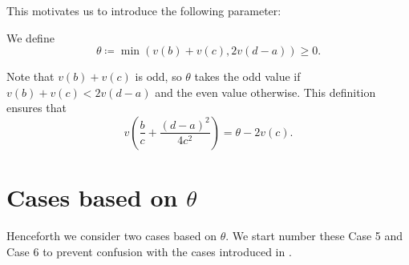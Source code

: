 This motivates us to introduce the following parameter:
\begin{definition}
  [$\theta$]
  We define
  \[ \theta \coloneqq \min \left( v(b)+v(c), 2v(d-a) \right) \ge 0. \]
\end{definition}
Note that $v(b) + v(c)$ is odd,
so $\theta$ takes the odd value if $v(b)+v(c) < 2v(d-a)$ and the even value otherwise.
This definition ensures that
\[ v \left( \frac bc + \frac{(d-a)^2}{4c^2} \right) = \theta - 2v(c). \]

\section{Cases based on $\theta$}
Henceforth we consider two cases based on $\theta$.
We start number these Case 5 and Case 6 to prevent confusion
with the cases introduced in .

